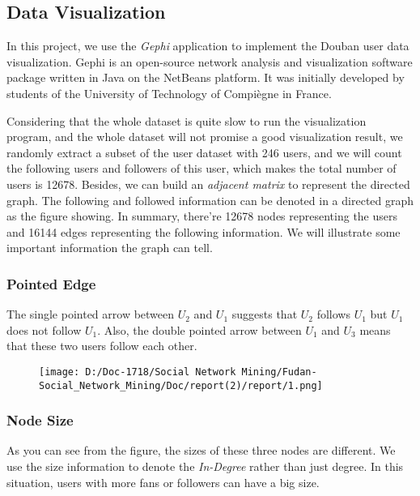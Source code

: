 \documentclass[]{article}
\date{}
\begin{document}
\hypertarget{header-n0}{%
\subsection{Data Visualization}\label{header-n0}}

In this project, we use the \emph{Gephi} application to implement the
Douban user data visualization. Gephi is an open-source network analysis
and visualization software package written in Java on the NetBeans
platform. It was initially developed by students of the University of
Technology of Compiègne in France.

Considering that the whole dataset is quite slow to run the
visualization program, and the whole dataset will not promise a good
visualization result, we randomly extract a subset of the user dataset
with 246 users, and we will count the following users and followers of
this user, which makes the total number of users is 12678. Besides, we
can build an \emph{adjacent matrix} to represent the directed graph. The
following and followed information can be denoted in a directed graph as
the figure showing. In summary, there're 12678 nodes representing the
users and 16144 edges representing the following information. We will
illustrate some important information the graph can tell.

\hypertarget{header-n6}{%
\subsubsection{Pointed Edge}\label{header-n6}}

The single pointed arrow between \(U_2\) and \(U_1\) suggests that
\(U_2\) follows \(U_1\) but \(U_1\) does not follow \(U_1\). Also, the
double pointed arrow between \(U_1\) and \(U_3\) means that these two
users follow each other.\\

\begin{figure}
\centering
\texttt{[image: D:/Doc-1718/Social Network Mining/Fudan-Social\_Network\_Mining/Doc/report(2)/report/1.png]}
\caption{}
\end{figure}

\hypertarget{header-n13}{%
\subsubsection{Node Size}\label{header-n13}}

As you can see from the figure, the sizes of these three nodes are
different. We use the size information to denote the \emph{In-Degree}
rather than just degree. In this situation, users with more fans or
followers can have a big size.
\end{document}

